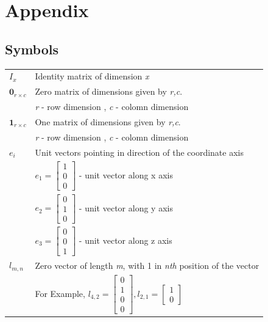 \chapter{Appendix}
\section{Symbols}
\label{sec:symbols}
\begin{tabular}{p{2cm} l}
$I_{x}$ & Identity matrix of dimension \emph{x} \\
$\textbf{0}_{r \times c}$ & Zero matrix of dimensions given by \emph{r,c}. \\
						  & \emph{r} - row dimension , \emph{c} - colomn dimension \\
$\textbf{1}_{r \times c}$ & One matrix of dimensions given by \emph{r,c}. \\
    					  & \emph{r} - row dimension , \emph{c} - colomn dimension \\						  
$e_i$ 			& Unit vectors pointing in direction of the coordinate axis  \\
				& $e_1 = \begin{bmatrix} 1 \\ 0 \\ 0 \end{bmatrix} $ - unit vector along x axis \\						& $e_2 = \begin{bmatrix} 0 \\ 1 \\ 0 \end{bmatrix} $ - unit vector along y axis \\						& $e_3 = \begin{bmatrix} 0 \\ 0 \\ 1 \end{bmatrix} $ - unit vector along z axis \\	
$l_{m,n}$    	& Zero vector of length \emph{m}, with 1 in \emph{nth} position of the vector \\
			    & For Example, $l_{4,2} = \begin{bmatrix} 0 \\ 1 \\ 0 \\ 0 \end{bmatrix}, l_{2,1} = 						\begin{bmatrix} 1 \\ 0 \end{bmatrix} $ \\		
\end{tabular}

